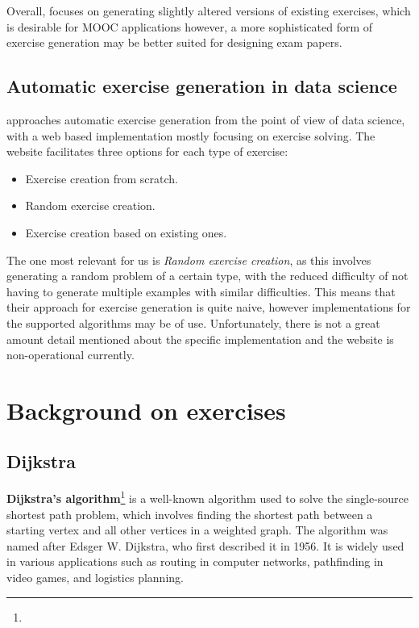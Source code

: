 \documentclass{l4proj}
\begin{document}
Overall, \citet{Sad12} focuses on generating slightly altered versions of existing exercises, which is desirable for MOOC applications however, a more sophisticated form of exercise generation may be better suited for designing exam papers.

\subsection{Automatic exercise generation in data science}
\citet{Kot19} approaches automatic exercise generation from the point of view of data science, with a web based implementation mostly focusing on exercise solving. The website facilitates three options for each type of exercise: 

\begin{itemize}
	\item
	Exercise creation from scratch. 
	\item
	Random exercise creation. 
	\item
	Exercise creation based on existing ones. 
\end{itemize}

The one most relevant for us is \emph{Random exercise creation}, as this involves generating a random problem of a certain type, with the reduced difficulty of not having to generate multiple examples with similar difficulties. This means that their approach for exercise generation is quite naive, however implementations for the supported algorithms may be of use. Unfortunately, there is not a great amount detail mentioned about the specific implementation and the website is non-operational currently.

\section{Background on exercises}
\subsection{Dijkstra}

\textbf{Dijkstra's algorithm}\footnote{} is a well-known algorithm used to solve the single-source shortest path problem, which involves finding the shortest path between a starting vertex and all other vertices in a weighted graph. The algorithm was named after Edsger W. Dijkstra, who first described it in 1956. It is widely used in various applications such as routing in computer networks, pathfinding in video games, and logistics planning.
\end{document}
